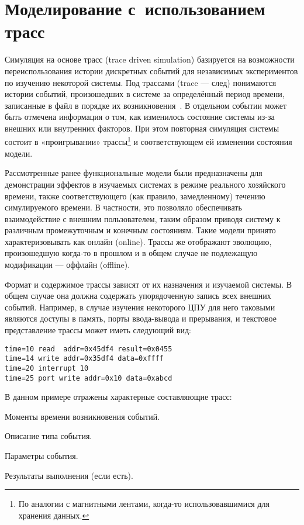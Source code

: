 \chapter{Моделирование с~использованием трасс}\label{chapter05}


Симуляция на основе трасс (\abbr trace driven simulation) базируется на возможности переиспользования истории дискретных событий для независимых экспериментов по изучению некоторой системы. Под трассами (\abbr trace --- след) понимаются истории событий, произошедших в системе за определённый период времени, записанные в файл в порядке их возникновения~\cite{DBLP:conf/ispass/RicoDCERV11}. В отдельном событии может быть отмечена информация о том, как изменилось состояние системы из-за внешних или внутренних факторов. При этом повторная симуляция системы состоит в «проигрывании» трассы\footnote{По аналогии с магнитными лентами, когда-то использовавшимися для хранения данных.} и соответствующем ей изменении состояния модели.

Рассмотренные ранее функциональные модели были предназначены для демонстрации эффектов в изучаемых системах в режиме реального хозяйского времени, также  соответствующего (как правило, замедленному) течению симулируемого времени. В частности, это позволяло обеспечивать взаимодействие с внешним  пользователем, таким образом приводя систему к различным промежуточным и конечным состояниям. Такие модели принято характеризовывать как онлайн (\abbr online). Трассы же отображают эволюцию, произошедшую когда-то в прошлом и в общем случае не подлежащую модификации --- оффлайн (\abbr offline). 

Формат и содержимое трассы зависят от их назначения и изучаемой системы. В общем случае она должна содержать упорядоченную запись всех внешних событий. Например, в случае изучения некоторого ЦПУ для него таковыми являются доступы в память, порты ввода-вывода и прерывания, и текстовое представление трассы может иметь следующий вид:

\begin{lstlisting}
time=10 read  addr=0x45df4 result=0x0455
time=14 write addr=0x35df4 data=0xffff
time=20 interrupt 10
time=25 port write addr=0x10 data=0xabcd
\end{lstlisting}

В данном примере отражены характерные составляющие трасс:
\begin{itemize*}
    \item Моменты времени возникновения событий.
    \item Описание типа события.
    \item Параметры события.
    \item Результаты выполнения (если есть).
\end{itemize*}


